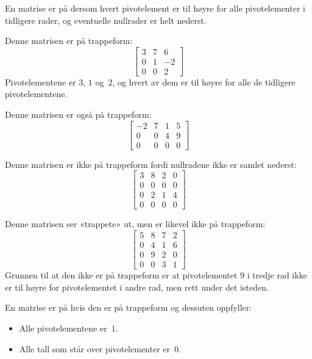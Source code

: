 \begin{defn}
En matrise er på  dersom hvert pivotelement er til
høyre for alle pivotelementer i tidligere rader, og eventuelle
nullrader er helt nederst.
\end{defn}

\begin{ex}
\label{ex:trappeform}
Denne matrisen er på trappeform:
\[
\begin{bmatrix}
3 & 7 & 6 \\
0 & 1 & -2 \\
0 & 0 & 2
\end{bmatrix}
\]
Pivotelementene er $3$, $1$ og~$2$, og hvert av dem er til høyre for
alle de tidligere pivotelementene.

Denne matrisen er også på trappeform:
\[
\begin{bmatrix}
-2 & 7 & 1 & 5 \\
 0 & 0 & 4 & 9 \\
 0 & 0 & 0 & 0
\end{bmatrix}
\]

Denne matrisen er ikke på trappeform fordi nullradene ikke er samlet
nederst:
\[
\begin{bmatrix}
3 & 8 & 2 & 0 \\
0 & 0 & 0 & 0 \\
0 & 2 & 1 & 4 \\
0 & 0 & 0 & 0
\end{bmatrix}
\]

Denne matrisen ser «trappete» ut, men er likevel ikke på trappeform:
\[
\begin{bmatrix}
5 & 8 & 7 & 2 \\
0 & 4 & 1 & 6 \\
0 & 9 & 2 & 0 \\
0 & 0 & 3 & 1
\end{bmatrix}
\]
Grunnen til at den ikke er på trappeform er at pivotelementet $9$ i
tredje rad ikke er til høyre for pivotelementet i andre rad, men rett
under det isteden.
\end{ex}

\begin{defn}
En matrise er på  hvis den er på
trappeform og dessuten oppfyller:
\begin{itemize}
\item Alle pivotelementene er~$1$.
\item Alle tall som står over pivotelementer er~$0$.\qedhere
\end{itemize}
\end{defn}

